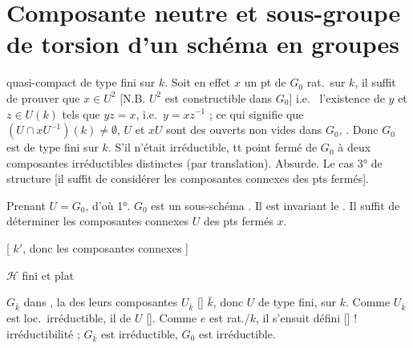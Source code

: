 \documentclass[11pt,a4paper]{article}
\begin{document}
\section{Composante neutre et sous-groupe de torsion d'un schéma en groupes}

\ill{} quasi-compact de type fini sur $k$. Soit en effet $x$ un pt de $G_0$ rat.\ sur $k$, il suffit de prouver que $x \in U^2$ [N.B. $U^2$ est constructible  dans $G_0$] i.e.\  l'existence de $y$ et $z \in U(k)$ tels que $yz = x$, i.e.\ $y = xz^{-1}$ ; ce qui signifie que $(U \cap xU^{-1})(k) \neq \emptyset$,  $U$ et $xU$ sont des ouverts non vides dans $G_0$, \struck{\ill{}}. Donc $G_0$ est de type fini sur $k$. S'il n'était irréductible, tt point fermé de $G_0$  à \struck{\ill{}} deux composantes irréductibles distinctes (par translation). Absurde. Le cas \ill{} \struck{\ill{}} 3°  \ill{} de  structure [il suffit de considérer les composantes connexes des pts fermés].

\struck{\ill{}} Prenant $U = G_0$, \ill{} d'où \ill{} 1°. \struck{\ill{}} $G_0$ est un sous-schéma . Il est invariant    le .  Il suffit de déterminer les composantes connexes $U$ des pts fermés $x$. \struck{\ill{}}

\struck{\ill{} \ill{} \ill{} \ill{} \ill{}}
[\ill{} $k'$, donc les composantes connexes \ill{} \ill{} \ill{}]


$\mathcal{H}$ \ill{} \ill{} \ill{} \ill{} fini et plat 

$G_{\bar k}$ \ill{} dans \ill{},  la  des
\ill{} leurs composantes \ill{} \ill{} $U_{\bar k}$ []
 $\bar k$, donc $U$  \ill{} de type fini, sur $k$. Comme $U_{\bar k}$ est
loc.\ irréductible, il \ill{} \ill{} de \ill{} \ill{} $U$ []. Comme $e$ est rat./$k$, il s'ensuit \ill{} \ill{} \add{\ill{}} \ill{} défini \ill{} \ill{}
[] \ill{} \ill{} ! irréductibilité ; \struck{\ill{}}  $G_{\bar k}$ est irréductible, $G_0$ est irréductible.
\end{document}
